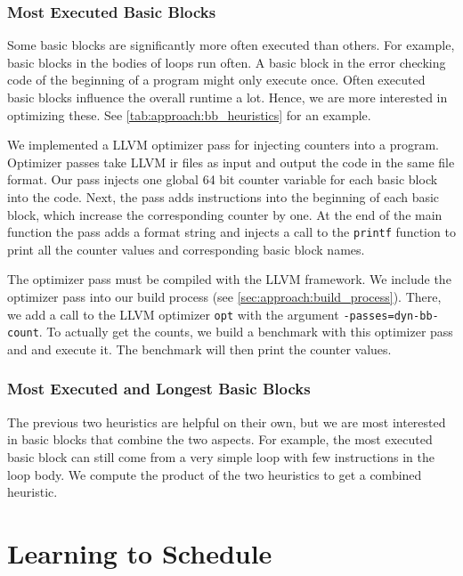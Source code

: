 \subsubsection{Most Executed Basic Blocks}
Some basic blocks are significantly more often executed than others.
For example, basic blocks in the bodies of loops run often.
A basic block in the error checking code of the beginning of a program might only execute once.
Often executed basic blocks influence the overall runtime a lot.
Hence, we are more interested in optimizing these.
See \cref{tab:approach:bb_heuristics} for an example.

We implemented a LLVM optimizer pass for injecting counters into a program.
Optimizer passes take LLVM \ac{ir} files as input and output the code in the same file format.
Our pass injects one global 64 bit counter variable for each basic block into the code.
Next, the pass adds instructions into the beginning of each basic block, which increase the corresponding counter by one.
At the end of the main function the pass adds a format string and injects a call to the \lstinline{printf} function to print all the counter values and corresponding basic block names.

The optimizer pass must be compiled with the LLVM framework.
We include the optimizer pass into our build process (see \cref{sec:approach:build_process}).
There, we add a call to the LLVM optimizer \lstinline{opt} with the argument \mbox{\lstinline{-passes=dyn-bb-count}}.
To actually get the counts, we build a benchmark with this optimizer pass and and execute it.
The benchmark will then print the counter values.

\subsubsection{Most Executed and Longest Basic Blocks}
The previous two heuristics are helpful on their own, but we are most interested in basic blocks that combine the two aspects.
For example, the most executed basic block can still come from a very simple loop with few instructions in the loop body.
We compute the product of the two heuristics to get a combined heuristic.

\section{Learning to Schedule}
\label{sec:approach:ml}
